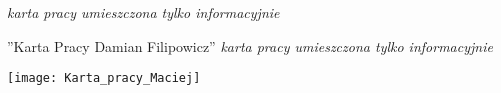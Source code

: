 \newpage
\textit{karta pracy umieszczona tylko informacyjnie}

''Karta Pracy Damian Filipowicz''
\newpage
\textit{karta pracy umieszczona tylko informacyjnie}

\texttt{[image: Karta\_pracy\_Maciej]}
\null 

